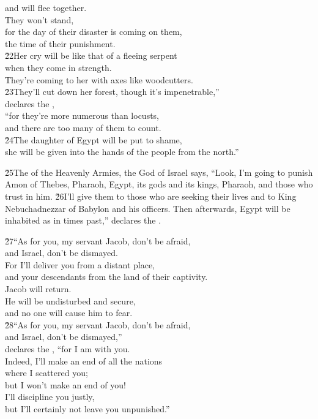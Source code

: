 \begin{poetry}
\poemll    and will flee together. \\
\poeml They won't stand, \\
\poemll    for the day of their disaster is coming on them, \\
\poemlll       the time of their punishment. \\
\poeml \v{22}Her cry will be like that of a fleeing serpent \\
\poemll    when they come in strength. \\
\poemlll       They're coming to her with axes like woodcutters. \\
\poeml \v{23}They'll cut down her forest, though it's impenetrable,'' \\
\poemll    declares the , \\
\poeml ``for they're more numerous than locusts, \\
\poemll    and there are too many of them to count. \\
\poeml \v{24}The daughter of Egypt will be put to shame, \\
\poemll    she will be given into the hands of the people from the north.''
\end{poetry}

\v{25}The  of the Heavenly Armies, the God of Israel says, ``Look, I'm going to punish Amon of Thebes, Pharaoh, Egypt, its gods and its kings, Pharaoh, and those who trust in him. \v{26}I'll give them to those who are seeking their lives and to King Nebuchadnezzar of Babylon and his officers. Then afterwards, Egypt will be inhabited as in times past,'' declares the .

\begin{poetry}
\poeml \v{27}``As for you, my servant Jacob, don't be afraid, \\
\poemll    and Israel, don't be dismayed. \\
\poeml For I'll deliver you from a distant place, \\
\poemll    and your descendants from the land of their captivity. \\
\poeml Jacob will return. \\
\poemll    He will be undisturbed and secure, \\
\poemlll       and no one will cause him to fear. \\
\poeml \v{28}``As for you, my servant Jacob, don't be afraid, \\
\poemll    and Israel, don't be dismayed,'' \\
\poemlll       declares the , ``for I am with you. \\
\poeml Indeed, I'll make an end of all the nations \\
\poemll    where I scattered you; \\
\poemll    but I won't make an end of you! \\
\poeml I'll discipline you justly, \\
\poemll    but I'll certainly not leave you unpunished.''
\end{poetry}

